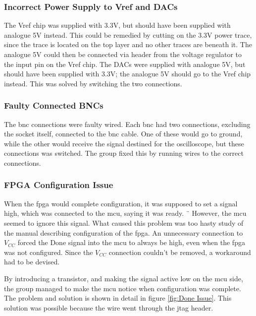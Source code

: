 \subsubsection{Incorrect Power Supply to Vref and DACs}
The Vref chip was supplied with 3.3V, but should have been supplied with analogue 5V instead. 
This could be remedied by cutting on the 3.3V power trace, since the trace is located on the top layer and no other traces are beneath it. 
The analogue 5V could then be connected via header from the voltage regulator to the input pin on the Vref chip.
\newline
The DACs were supplied with analogue 5V, but should have been supplied with 3.3V; the analogue 5V should go to the Vref chip instead. 
This was solved by switching the two connections.

\subsubsection{Faulty Connected BNCs}
The \gls{bnc} connections were faulty wired. 
Each \gls{bnc} had two connections, excluding the socket itself, connected to the \gls{bnc} cable. 
One of these would go to ground, while the other would receive the signal destined for the oscilloscope, but these connections was switched. 
The group fixed this by running wires to the correct connections.

\subsubsection{FPGA Configuration Issue}
When the \gls{fpga} would complete configuration, it was supposed to set a signal high, which was connected to the \gls{mcu}, saying it was ready. ¨
However, the \gls{mcu} seemed to ignore this signal. 
What caused this problem was too hasty study of the manual describing configuration of the \gls{fpga}.
An unnecessary connection to \(V_{CC}\) forced the Done signal into the \gls{mcu} to always be high, even when the \gls{fpga} was not configured. 
Since the \(V_{CC}\) connection couldn't be removed, a workaround had to be devised.

By introducing a transistor, and making the signal active low on the \gls{mcu} side, the group managed to make the \gls{mcu} notice when configuration was complete.
The problem and solution is shown in detail in figure \ref{fig:Done Issue}.
This solution was possible because the wire went through the \gls{jtag} header.

